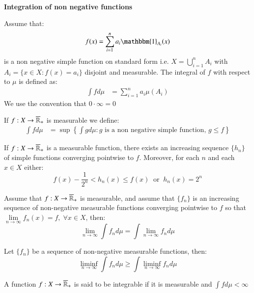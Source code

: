\centerline{\textbf{Integration of non negative functions}}

\begin{definition}
\label{def: int_simple_function}
Assume that: 
\[
f(x) = \sum_{i=1}^{n}a_{i}\mathbbm{1}_{A_{i}}(x)
\]
is a non negative simple function on standard form i.e. $X = \bigcup_{i=1}^{n} A_{i}$ with $A_{i} = \{x\in X: f(x) = a_{i}\}$ disjoint and measurable. The integral of $f$ with respect to $\mu$ is defined as: 
\begin{align*}
\int fd\mu &= \sum_{i=1}^{n}a_{i}\mu(A_{i})    
\end{align*}
We use the convention that $0\cdot \infty = 0$
\end{definition}

\begin{definition}
If $f:X \to \overline{\mathbb{R}}_{+}$ is measurable we define: 
\begin{align*}
\int f d\mu 
&= 
\sup\left\{
\int gd\mu: \text{$g$ is a non negative simple function, $g\leq f$}
\right\}
\end{align*}
\end{definition}

\begin{proposition}
\label{prop: simple_functions_conv_pointwise_to_f}
If $f: X \to \overline{\mathbb{R}}_{+}$ is a measurable function, there exists an increasing sequence $\{h_{n}\}$ of simple functions converging pointwise to $f$. Moreover, for each $n$ and each $x\in X$ either:
\[
f(x) - \frac{1}{2^{n}} < h_{n}(x) \leq f(x) \;\;\text{or}\;\;
h_{n}(x) = 2^{n}
\]
\end{proposition}

\begin{theorem}
Assume that $f:X \to \overline{\mathbb{R}}_{+}$ is measurable, and assume that $\{f_{n}\}$ is an increasing sequence of non-negative measurable functions converging pointwise to $f$ so that $\lim\limits_{n\to \infty}f_{n}(x) = f,\; \forall x\in X$, then: 
\[ \lim_{n\to \infty}\int f_{n}d\mu = \int \lim_{n\to \infty}f_{n}d\mu
\]
\end{theorem}

\begin{theorem}
Let $\{f_{n}\}$ be a sequence of non-negative measurable functions, then: 
\[\liminf_{n\to \infty}\int f_{n}d\mu \geq \int \liminf_{n\to \infty}f_{n}d\mu
\]
\end{theorem}

\begin{definition}
A function $f:X \to \overline{\mathbb{R}}_{+}$ is said to be integrable if it is measurable and $\int f d\mu < \infty$    
\end{definition}



